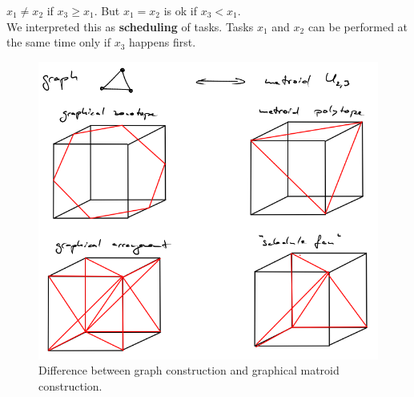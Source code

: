 \documentclass[12pt,reqno]{amsart}
\numberwithin{definition}{section}
\theoremstyle{definition}
\begin{document}



$x_1 \neq x_2$ if $x_3 \geq x_1$.  But $x_1 = x_2$ is ok if $x_3 < x_1$.\\

We interpreted this as {\bf{scheduling}} of tasks.  Tasks $x_1$ and
$x_2$ can be performed  at the same time only if $x_3$ happens first.

\begin{figure}[h]
\includegraphics[width=13cm]{graph-matroid}
\caption{Difference between graph construction and graphical matroid construction.}
\end{figure}
\end{document}
